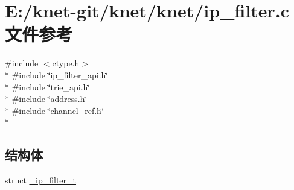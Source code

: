 \hypertarget{a00069}{}\section{E\+:/knet-\/git/knet/knet/ip\+\_\+filter.c 文件参考}
\label{a00069}
{\ttfamily \#include $<$ctype.\+h$>$}\\*
{\ttfamily \#include \char`\"{}ip\+\_\+filter\+\_\+api.\+h\char`\"{}}\\*
{\ttfamily \#include \char`\"{}trie\+\_\+api.\+h\char`\"{}}\\*
{\ttfamily \#include \char`\"{}address.\+h\char`\"{}}\\*
{\ttfamily \#include \char`\"{}channel\+\_\+ref.\+h\char`\"{}}\\*
\subsection*{结构体}
\begin{DoxyCompactItemize}
\item 
struct \hyperlink{a00017}{\+\_\+ip\+\_\+filter\+\_\+t}
\end{DoxyCompactItemize}
